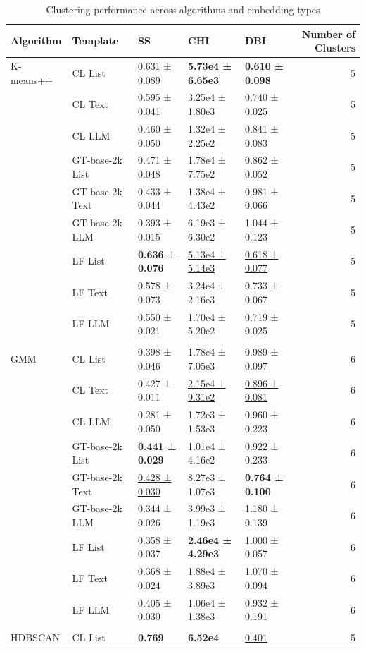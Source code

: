 \begin{table}[!h]
\centering
\caption{Clustering performance across algorithms and embedding types}
\centering
\begin{tabular}[t]{lllllr}
\toprule
Algorithm & Template & SS & CHI & DBI & Number of Clusters\\
\midrule
K-means++ & CL List & \underline{0.631 ± 0.089} & \textbf{5.73e4 ± 6.65e3} & \textbf{0.610 ± 0.098} & 5\\
 & CL Text & 0.595 ± 0.041 & 3.25e4 ± 1.80e3 & 0.740 ± 0.025 & 5\\
 & CL LLM & 0.460 ± 0.050 & 1.32e4 ± 2.25e2 & 0.841 ± 0.083 & 5\\
 & GT-base-2k List & 0.471 ± 0.048 & 1.78e4 ± 7.75e2 & 0.862 ± 0.052 & 5\\
 & GT-base-2k Text & 0.433 ± 0.044 & 1.38e4 ± 4.43e2 & 0.981 ± 0.066 & 5\\
\addlinespace
 & GT-base-2k LLM & 0.393 ± 0.015 & 6.19e3 ± 6.30e2 & 1.044 ± 0.123 & 5\\
 & LF List & \textbf{0.636 ± 0.076} & \underline{5.13e4 ± 5.14e3} & \underline{0.618 ± 0.077} & 5\\
 & LF Text & 0.578 ± 0.073 & 3.24e4 ± 2.16e3 & 0.733 ± 0.067 & 5\\
 & LF LLM & 0.550 ± 0.021 & 1.70e4 ± 5.20e2 & 0.719 ± 0.025 & 5\\
\midrule\\
GMM & CL List & 0.398 ± 0.046 & 1.78e4 ± 7.05e3 & 0.989 ± 0.097 & 6\\
\addlinespace
 & CL Text & 0.427 ± 0.011 & \underline{2.15e4 ± 9.31e2} & \underline{0.896 ± 0.081} & 6\\
 & CL LLM & 0.281 ± 0.050 & 1.72e3 ± 1.53e3 & 0.960 ± 0.223 & 6\\
 & GT-base-2k List & \textbf{0.441 ± 0.029} & 1.01e4 ± 4.16e2 & 0.922 ± 0.233 & 6\\
 & GT-base-2k Text & \underline{0.428 ± 0.030} & 8.27e3 ± 1.07e3 & \textbf{0.764 ± 0.100} & 6\\
 & GT-base-2k LLM & 0.344 ± 0.026 & 3.99e3 ± 1.19e3 & 1.180 ± 0.139 & 6\\
\addlinespace
 & LF List & 0.358 ± 0.037 & \textbf{2.46e4 ± 4.29e3} & 1.000 ± 0.057 & 6\\
 & LF Text & 0.368 ± 0.024 & 1.88e4 ± 3.89e3 & 1.070 ± 0.094 & 6\\
 & LF LLM & 0.405 ± 0.030 & 1.06e4 ± 1.38e3 & 0.932 ± 0.191 & 6\\
\midrule\\
HDBSCAN & CL List & \textbf{0.769} & \textbf{6.52e4} & \underline{0.401} & 5\\

\end{tabular}
\end{table}
